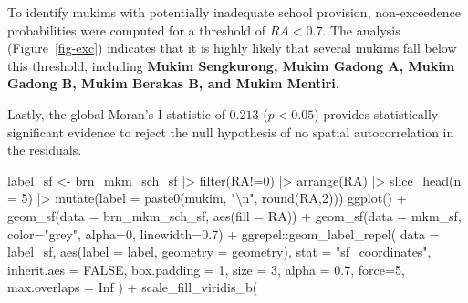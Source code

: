 \documentclass[
  12pt,
]{article}
\newenvironment{Shaded}{\begin{snugshade}}{\end{snugshade}}
\newcommand{\AttributeTok}[1]{\textcolor[rgb]{0.40,0.45,0.13}{#1}}
\newcommand{\ConstantTok}[1]{\textcolor[rgb]{0.56,0.35,0.01}{#1}}
\newcommand{\DecValTok}[1]{\textcolor[rgb]{0.68,0.00,0.00}{#1}}
\newcommand{\FloatTok}[1]{\textcolor[rgb]{0.68,0.00,0.00}{#1}}
\newcommand{\FunctionTok}[1]{\textcolor[rgb]{0.28,0.35,0.67}{#1}}
\newcommand{\NormalTok}[1]{\textcolor[rgb]{0.00,0.23,0.31}{#1}}
\newcommand{\OtherTok}[1]{\textcolor[rgb]{0.00,0.23,0.31}{#1}}
\newcommand{\SpecialCharTok}[1]{\textcolor[rgb]{0.37,0.37,0.37}{#1}}
\newcommand{\StringTok}[1]{\textcolor[rgb]{0.13,0.47,0.30}{#1}}
\begin{document}
To identify mukims with potentially inadequate school provision,
non-exceedence probabilities were computed for a threshold of
\(RA <0.7\). The analysis (Figure~\ref{fig-exc}) indicates that it is
highly likely that several mukims fall below this threshold, including
\textbf{Mukim Sengkurong, Mukim Gadong A, Mukim Gadong B, Mukim Berakas
B, and Mukim Mentiri}.

Lastly, the global Moran's I statistic of \(0.213\) (\(p<0.05\))
provides statistically significant evidence to reject the null
hypothesis of no spatial autocorrelation in the residuals.

\begin{Shaded}
\begin{Highlighting}[]
\NormalTok{label\_sf }\OtherTok{\textless{}{-}}\NormalTok{ brn\_mkm\_sch\_sf }\SpecialCharTok{|\textgreater{}} 
  \FunctionTok{filter}\NormalTok{(RA}\SpecialCharTok{!=}\DecValTok{0}\NormalTok{) }\SpecialCharTok{|\textgreater{}} 
  \FunctionTok{arrange}\NormalTok{(RA) }\SpecialCharTok{|\textgreater{}} 
  \FunctionTok{slice\_head}\NormalTok{(}\AttributeTok{n =} \DecValTok{5}\NormalTok{) }\SpecialCharTok{|\textgreater{}} 
  \FunctionTok{mutate}\NormalTok{(}\AttributeTok{label =} \FunctionTok{paste0}\NormalTok{(mukim, }\StringTok{"}\SpecialCharTok{\textbackslash{}n}\StringTok{"}\NormalTok{, }\FunctionTok{round}\NormalTok{(RA,}\DecValTok{2}\NormalTok{)))}
\FunctionTok{ggplot}\NormalTok{() }\SpecialCharTok{+}
  \FunctionTok{geom\_sf}\NormalTok{(}\AttributeTok{data =}\NormalTok{ brn\_mkm\_sch\_sf, }\FunctionTok{aes}\NormalTok{(}\AttributeTok{fill =}\NormalTok{ RA)) }\SpecialCharTok{+}
  \FunctionTok{geom\_sf}\NormalTok{(}\AttributeTok{data =}\NormalTok{ mkm\_sf, }\AttributeTok{color=}\StringTok{"grey"}\NormalTok{, }\AttributeTok{alpha=}\DecValTok{0}\NormalTok{, }\AttributeTok{linewidth=}\FloatTok{0.7}\NormalTok{) }\SpecialCharTok{+}
\NormalTok{  ggrepel}\SpecialCharTok{::}\FunctionTok{geom\_label\_repel}\NormalTok{(}
    \AttributeTok{data =}\NormalTok{ label\_sf,}
    \FunctionTok{aes}\NormalTok{(}\AttributeTok{label =}\NormalTok{ label, }\AttributeTok{geometry =}\NormalTok{ geometry),}
    \AttributeTok{stat =} \StringTok{"sf\_coordinates"}\NormalTok{,}
    \AttributeTok{inherit.aes =} \ConstantTok{FALSE}\NormalTok{,}
    \AttributeTok{box.padding =} \DecValTok{1}\NormalTok{,}
    \AttributeTok{size =} \DecValTok{3}\NormalTok{,}
    \AttributeTok{alpha =} \FloatTok{0.7}\NormalTok{,}
    \AttributeTok{force=}\DecValTok{5}\NormalTok{,}
    \AttributeTok{max.overlaps =} \ConstantTok{Inf}
\NormalTok{  ) }\SpecialCharTok{+}
  \FunctionTok{scale\_fill\_viridis\_b}\NormalTok{(}

\end{Highlighting}
\end{Shaded}
\end{document}
